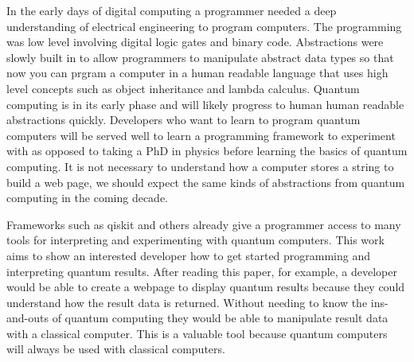 \documentclass{article}
\begin{document}
In the early days of digital computing a programmer needed a deep understanding of electrical engineering to program computers. The programming was low level involving digital logic gates and binary code. Abstractions were slowly built in to allow programmers to manipulate abstract data types so that now you can prgram a computer in a human readable language that uses high level concepts such as object inheritance and lambda calculus. Quantum computing is in its early phase and will likely progress to human human readable abstractions quickly. Developers who want to learn to program quantum computers will be served well to learn a programming framework to experiment with as opposed to taking a PhD in physics before learning the basics of quantum computing. It is not necessary to understand how a computer stores a string to build a web page, we should expect the same kinds of abstractions from quantum computing in the coming decade.

Frameworks such as qiskit and others already give a programmer access to many tools for interpreting and experimenting with quantum computers. This work aims to show an interested developer how to get started programming and interpreting quantum results. After reading this paper, for example, a developer would be able to create a webpage to display quantum results because they could understand how the result data is returned. Without needing to know the ins-and-outs of quantum computing they would be able to manipulate result data with a classical computer. This is a valuable tool because quantum computers will always be used with classical computers.
\end{document}
